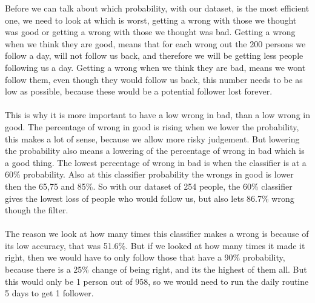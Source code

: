 Before we can talk about which probability, with our dataset, is the most efficient one, we need to look at which is worst, getting a wrong with those we thought was good or getting a wrong with those we thought was bad. Getting a wrong when we think they are good, means that for each wrong out the 200 persons we follow a day, will not follow us back, and therefore we will be getting less people following us a day. Getting a wrong when we think they are bad, means we wont follow them, even though they would follow us back, this number needs to be as low as possible, because these would be a potential follower lost forever.\\
\\
This is why it is more important to have a low wrong in bad, than a low wrong in good. The percentage of wrong in good is rising when we lower the probability, this makes a lot of sense, because we allow more risky judgement. But lowering the probability also means a lowering of the percentage of wrong in bad which is a good thing. The lowest percentage of wrong in bad is when the classifier is at a 60\% probability. Also at this classifier probability the wrongs in good is lower then the  65,75 and 85\%. So with our dataset of 254 people, the 60\% classifier gives the lowest loss of people who would follow us, but also lets 86.7\% wrong though the filter.\\
\\
The reason we look at how many times this classifier makes a wrong is because of its low accuracy, that was 51.6\%. But if we looked at how many times it made it right, then we would have to only follow those that have a 90\% probability, because there is a 25\% change of being right, and its the highest of them all. But this would only be 1 person out of 958, so we would need to run the daily routine 5 days to get 1 follower.